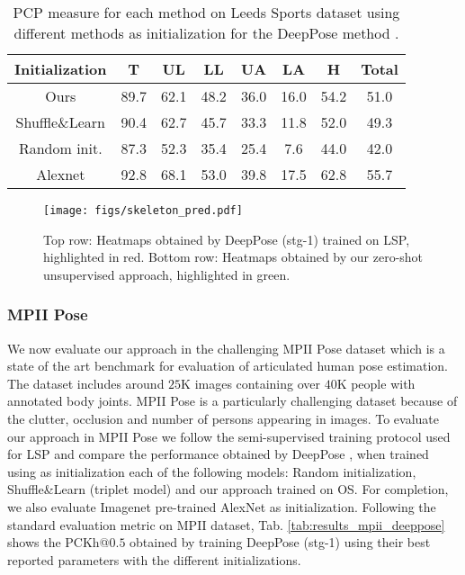 \documentclass[10pt,twocolumn,letterpaper]{article}
\begin{document}
\begin{table}[!t]
    \scriptsize
    \centering
    \begin{tabular}{|c|c|c|c|c|c|c|c|}
    \hline
    Initialization  &T &UL &LL &UA &LA &H  &Total \\
    \hline
    Ours & 89.7 & 62.1 & 48.2 & 36.0 & 16.0 & 54.2 &  51.0\\
    \hline
    Shuffle\&Learn \cite{shuffleandlearn} & 90.4 & 62.7 & 45.7 & 33.3 & 11.8 & 52.0 &  49.3\\
    \hline
    Random init. & 87.3 & 52.3 & 35.4 & 25.4 & 7.6 & 44.0 &  42.0\\
    \hline
    \hline
    Alexnet \cite{alexnet} & 92.8 & 68.1 & 53.0 & 39.8 & 17.5 & 62.8 &  55.7\\
    \hline
    \end{tabular}
    \caption{PCP measure for each method on Leeds Sports dataset using different methods as initialization for the DeepPose method \cite{deeppose}.}
    \label{tab:results_lsp_deeppose}
\end{table}


\begin{figure*}
\texttt{[image: figs/skeleton\_pred.pdf]}
\caption{Top row: Heatmaps obtained by DeepPose (stg-1) \cite{deeppose} trained on LSP, highlighted in red. Bottom row: Heatmaps obtained by our zero-shot unsupervised approach, highlighted in green.}
\label{fig:heatmap_pred}
\end{figure*}


\subsubsection{MPII Pose}

We now evaluate our approach in the challenging MPII Pose dataset \cite{mpii} which is a state of the art benchmark for evaluation of articulated human pose estimation. The dataset includes around $25$K images containing over $40$K people with annotated body joints. MPII Pose is a particularly challenging dataset because of the clutter, occlusion and number of persons appearing in images. To evaluate our approach in MPII Pose we follow the semi-supervised training protocol used for LSP and compare the performance obtained by DeepPose \cite{deeppose}, when trained using as initialization each of the following models: Random initialization, Shuffle\&Learn \cite{shuffleandlearn} (triplet model) and our approach trained on OS. For completion, we also evaluate Imagenet pre-trained AlexNet \cite{alexnet} as initialization. Following the standard evaluation metric on MPII dataset, Tab. \ref{tab:results_mpii_deeppose} shows the PCKh@$0.5$ obtained by training DeepPose (stg-1) using their best reported parameters with the different initializations. 
\end{document}
